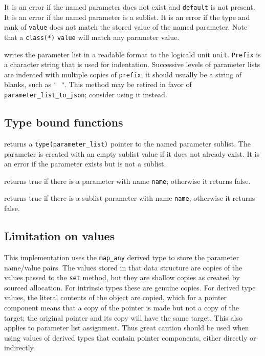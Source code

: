 \documentclass[11pt]{article}
\begin{document}
\begin{description}[style=nextline]
  It is an error if the named parameter does not exist and \texttt{default}
  is not present.  It is an error if the named parameter is a sublist.
  It is an error if the type and rank of \texttt{value} does not match the
  stored value of the named parameter.  Note that a \texttt{class(*)}
  \texttt{value} will match any parameter value.
\item[\texttt{print(unit, prefix)}]
  writes the parameter list in a readable format to the logicald unit
  \texttt{unit}.  \texttt{Prefix} is a character string that is used
  for indentation.  Successive levels of parameter lists are indented
  with multiple copies of \texttt{prefix}; it should usually be a string
  of blanks, such as \texttt{"  "}.  This method may be retired in favor
  of \texttt{parameter_list_to_json}; consider using it instead.
\end{description}

\subsection{Type bound functions}
\begin{description}[style=nextline]\setlength{\itemsep}{0pt}
\item[\texttt{sublist(name \Lbr,stat \Lbr,errmsg\Rbr\Rbr)}]
  returns a \texttt{type(parameter_list)} pointer to the named parameter
  sublist.  The parameter is created with an empty sublist value if it
  does not already exist.  It is an error if the parameter exists but is
  not a sublist.
\item[\texttt{is_parameter(name)}]
  returns true if there is a parameter with name \texttt{name};
  otherwise it returns false.
\item[\texttt{is_sublist(name)}]
  returns true if there is a sublist parameter with name \texttt{name};
  otherwise it returns false.
\end{description}

\subsection{Limitation on values}
This implementation uses the \texttt{map_any} derived type to store the
parameter name/value pairs.  The values stored in that data structure are
copies of the values passed to the \texttt{set} method, but they are shallow
copies as created by sourced allocation.  For intrinsic types these are
genuine copies.  For derived type values, the literal contents of the object
are copied, which for a pointer component means that a copy of the pointer
is made but not a copy of the target; the original pointer and its copy will
have the same target.  This also applies to parameter list assignment.
Thus great caution should be used when using values of derived types that
contain pointer components, either directly or indirectly.
\end{document}

